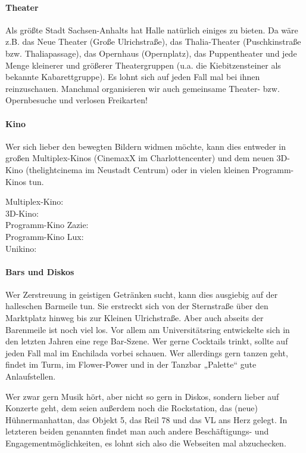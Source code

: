 \paragraph{Theater}
Als größte Stadt Sachsen-Anhalts hat Halle natürlich einiges zu bieten.
Da wäre z.B. das Neue Theater (Große Ulrichstraße), das Thalia-Theater (Puschkinstraße bzw. Thaliapassage), das Opernhaus (Opernplatz), das Puppentheater und jede Menge kleinerer und größerer Theatergruppen (\;u.a. die Kiebitzensteiner als bekannte Kabarettgruppe).
Es lohnt sich auf jeden Fall mal bei ihnen reinzuschauen.
Manchmal organisieren wir auch gemeinsame Theater- bzw. Opernbesuche und verlosen Freikarten!

\paragraph{Kino}
Wer sich lieber den bewegten Bildern widmen möchte, kann dies entweder in großen Multiplex-Kinos (CinemaxX im Charlottencenter) und dem neuen 3D-Kino (thelightcinema im Neustadt Centrum) oder in vielen kleinen Programm-Kinos tun.

Multiplex-Kino: \\
3D-Kino: \\
Programm-Kino Zazie: \\
Programm-Kino Lux: \\
Unikino: 


\paragraph{Bars und Diskos}
Wer Zerstreuung in geistigen Getränken sucht, kann dies ausgiebig auf der halleschen Barmeile tun.
Sie erstreckt sich von der Sternstraße über den Marktplatz hinweg bis zur Kleinen Ulrichstraße.
Aber auch abseits der Barenmeile ist noch viel los.
Vor allem am Universitätsring entwickelte sich in den letzten Jahren eine rege Bar-Szene.
Wer gerne Cocktails trinkt, sollte auf jeden Fall mal im Enchilada vorbei schauen.
Wer allerdings gern tanzen geht, findet im Turm, im Flower-Power und in der Tanzbar „Palette“ gute Anlaufstellen.

Wer zwar gern Musik hört, aber nicht so gern in Diskos, sondern lieber auf Konzerte geht, dem seien außerdem noch die Rockstation, das (neue) Hühnermanhattan, das Objekt 5, das Reil 78 und das VL ans Herz gelegt.
In letzteren beiden genannten findet man auch andere Beschäftigungs- und Engagementmöglichkeiten, es lohnt sich also die Webseiten mal abzuchecken.

